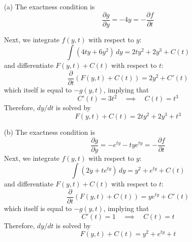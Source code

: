 \documentclass[a4paper]{article}
\begin{document}
(a) The exactness condition is
\[
	\frac{\partial g}{\partial y} = -4y = -\frac{\partial f}{\partial t}  
\]

Next, we integrate \(f \!\left( y,t \right) \) with respect to \(y\):
\[
	\int \!\left( 4ty + 6y^{2} \right) \, dy = 2ty^{2} + 2y^{3} + C \!\left( t \right) 
\]
and differentiate \(F \!\left( y, t \right) + C \!\left( t \right) \) with respect to \(t\):
\[
	\frac{\partial }{\partial t} \!\left( F \!\left( y,t \right) + C \!\left( t \right)  \right) = 2y^{2} + C' \!\left( t \right) 
\]
which itself is equal to \(-g \!\left( y, t \right) \), implying that
\[
	C' \!\left( t \right) = 3t^{2} \quad \implies \quad C \!\left( t \right) = t^{3}
\]
Therefore, \(dy/dt\) is solved by
\[
	F \!\left( y,t \right) + C \!\left( t \right) = 2ty^{2} + 2y^{3} + t^{3}
\]

(b) The exactness condition is
\[
	\frac{\partial g}{\partial y} = -e^{ty} - tye^{ty} = -\frac{\partial f}{\partial t} 
\]
Next, we integrate \(f \!\left( y,t \right) \) with respect to \(y\):
\[
	\int \!\left( 2y + te^{ty} \right) \, dy = y^{2} + e^{ty} + C \!\left( t \right) 
\]
and differentiate \(F \!\left( y,t \right) + C \!\left( t \right) \) with respect to \(t\):
\[
	\frac{\partial }{\partial t} \!\left( F \!\left( y, t \right) + C \!\left( t \right)  \right) = ye^{ty} + C'\!\left( t \right)  
\]
which itself is equal to \(-g \!\left( y,t \right) \), implying that
\[
	C'\!\left( t \right) = 1 \quad \implies \quad C \!\left( t \right) = t
\]
Therefore, \(dy/dt\) is solved by
\[
	F \!\left( y,t \right) + C \!\left( t \right) = y^{2} + e^{ty} + t
\]

\end{document}
